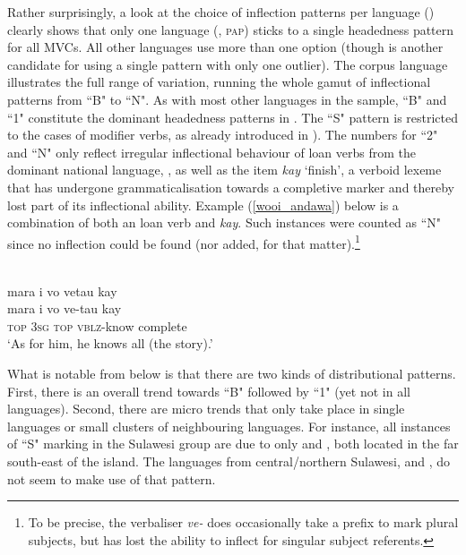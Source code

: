 Rather surprisingly, a look at the choice of inflection patterns per language () clearly shows that only one language (, \textsc{pap}) sticks to a single headedness pattern for all MVCs. All other languages use more than one option (though  is another candidate for using a single pattern with only one outlier). The corpus language  illustrates the full range of variation, running the whole gamut of inflectional patterns from ``B" to ``N". As with most other languages in the sample, ``B" and ``1" constitute the dominant headedness patterns in . The ``S" pattern is restricted to the cases of  modifier verbs, as already introduced in ). The numbers for ``2" and ``N" only reflect irregular inflectional behaviour of loan verbs from the dominant national language, , as well as the item \textit{kay} `finish', a verboid lexeme that has undergone grammaticalisation towards a completive marker and thereby lost part of its inflectional ability. Example (\ref{wooi_andawa}) below is a combination of both an  loan verb and \textit{kay}. Such instances were counted as ``N" since no inflection could be found (nor added, for that matter).\footnote{To be precise, the verbaliser \textit{ve-} does occasionally take a prefix to mark plural subjects, but has lost the ability to inflect for singular subject referents.}

\ea \label{wooi_andawa}
\\
\glll mara i vo vetau kay \\
mara i vo ve-tau kay \\
\textsc{top} \textsc{3}\textsc{sg} \textsc{top} \textsc{vblz}-know complete \\
\glft `As for him, he knows all (the story).' \\ 
\z

\newpage
What is notable from  below is that there are two kinds of distributional patterns. First, there is an overall trend towards ``B" followed by ``1" (yet not in all languages). Second, there are micro trends that only take place in single languages or small clusters of neighbouring languages. For instance, all instances of ``S" marking in the Sulawesi group are due to only  and , both located in the far south-east of the island. The languages from central/northern Sulawesi,  and , do not seem to make use of that pattern. 

